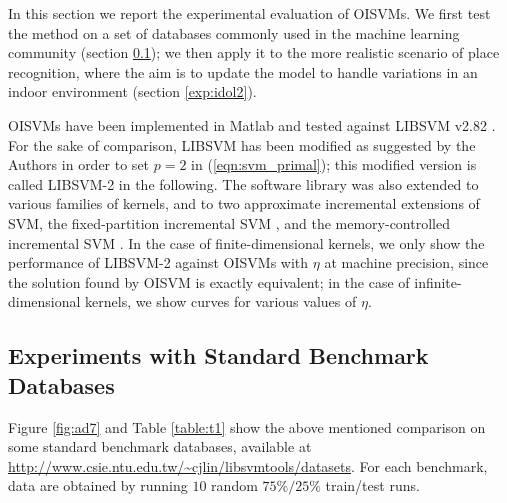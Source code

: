 In this section we report the experimental evaluation of OISVMs. We
first test the method on a set of databases commonly used in the
machine learning community (section \ref{exp:ml}); we then apply it to
the more realistic scenario of place recognition, where the aim is to
update the model to handle variations in an indoor environment
 (section
\ref{exp:idol2}).

OISVMs have been implemented in Matlab and tested against LIBSVM v2.82
\cite{ChangL01}. For the sake of comparison, LIBSVM has been modified
as suggested by the Authors in order to set $p=2$ in
(\ref{eqn:svm_primal}); this modified version is called LIBSVM-2 in
the following.  The software library was also extended to various
families of kernels, and to two approximate incremental extensions of
SVM, the fixed-partition incremental SVM \cite{syed99incremental}, and
the memory-controlled incremental SVM \cite{luo:icra07}.  In the case
of finite-dimensional kernels, we only show the performance of
LIBSVM-2 against OISVMs with $\eta$ at machine precision, since the
solution found by OISVM is exactly equivalent; in the case of
infinite-dimensional kernels, we show curves for various values of
$\eta$.

\subsection{Experiments with Standard Benchmark Databases}
\label{exp:ml}

Figure \ref{fig:ad7} and Table \ref{table:t1} show the above mentioned
comparison on some standard benchmark databases, available at
\url{http://www.csie.ntu.edu.tw/~cjlin/libsvmtools/datasets}.  For
each benchmark, data are obtained by running $10$ random $75\%/25\%$
train/test runs.

